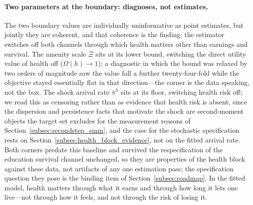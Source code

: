 \documentclass[12pt,a4paper]{article}
\begin{document}
\paragraph{Two parameters at the boundary: diagnoses, not estimates.} The two boundary values are individually uninformative as point estimates, but jointly they are coherent, and that coherence is the finding: the estimator switches off both channels through which health matters other than earnings and survival. The amenity scale $\Xi$ sits at its lower bound, switching the direct utility value of health off ($\Omega(h)\to 1$); a diagnostic in which the bound was relaxed by two orders of magnitude saw the value fall a further twenty-four-fold while the objective stayed essentially flat in that direction---the corner is the data speaking, not the box. The shock arrival rate $\bar\pi^h$ sits at its floor, switching health risk off; we read this as censoring rather than as evidence that health risk is absent, since the dispersion and persistence facts that motivate the shock are second-moment objects the target set excludes for the measurement reasons of Section~\ref{subsec:secondstep_smm}, and the case for the stochastic specification rests on Section~\ref{subsec:health_block_evidence}, not on the fitted arrival rate. Both corners predate this baseline and survived the respecification of the education survival channel unchanged, so they are properties of the health block against these data, not artifacts of any one estimation pass; the specification question they pose is the binding item of Section~\ref{subsec:roadmap}. In the fitted model, health matters through what it earns and through how long it lets one live---not through how it feels, and not through the risk of losing it.
\end{document}
